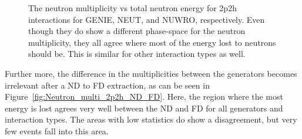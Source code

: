 \documentclass[12pt]{article}
\begin{document}
\begin{figure}
\begin{subfigure}[b]{0.32\textwidth}
\end{subfigure}
\caption{The neutron multiplicity vs total neutron energy for 2p2h interactions for GENIE, NEUT, and NUWRO, respectively.  Even though they do show a different phase-space for the neutron multiplicity, they all agree where most of the energy lost to neutrons should be.  This is similar for other interaction types as well.}
\label{fig:Neutron_multi_2p2h_ND}
\end{figure}

Further more, the difference in the multiplicities between the generators becomes irrelevant after a ND to FD extraction, as can be seen in Figure~\ref{fig:Neutron_multi_2p2h_ND_FD}.
Here, the region where the most energy is lost agrees very well between the ND and FD for all generators and interaction types.
The areas with low statistics do show a disagreement, but very few events fall into this area.
\end{document}
